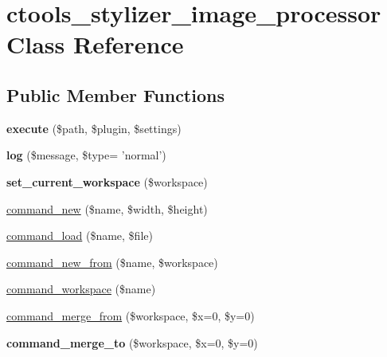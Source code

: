\hypertarget{classctools__stylizer__image__processor}{
\section{ctools\_\-stylizer\_\-image\_\-processor Class Reference}
\label{classctools__stylizer__image__processor}
}
\subsection*{Public Member Functions}
\begin{DoxyCompactItemize}
\item 
\hypertarget{classctools__stylizer__image__processor_a75d2a2d1fe5ef7708909e2fe6565268d}{
{\bfseries execute} (\$path, \$plugin, \$settings)}
\label{classctools__stylizer__image__processor_a75d2a2d1fe5ef7708909e2fe6565268d}

\item 
\hypertarget{classctools__stylizer__image__processor_a4cced5385e5b3165869dd30491621cfb}{
{\bfseries log} (\$message, \$type= 'normal')}
\label{classctools__stylizer__image__processor_a4cced5385e5b3165869dd30491621cfb}

\item 
\hypertarget{classctools__stylizer__image__processor_a357ae6f429c606217620187da9c78007}{
{\bfseries set\_\-current\_\-workspace} (\$workspace)}
\label{classctools__stylizer__image__processor_a357ae6f429c606217620187da9c78007}

\item 
\hyperlink{classctools__stylizer__image__processor_a8d40f8e9f29eef9d25907a05dd9874d7}{command\_\-new} (\$name, \$width, \$height)
\item 
\hyperlink{classctools__stylizer__image__processor_ac609fbaeff7f515d601195936f7e57d2}{command\_\-load} (\$name, \$file)
\item 
\hyperlink{classctools__stylizer__image__processor_a596478b51c878b732f2ad7512bc566df}{command\_\-new\_\-from} (\$name, \$workspace)
\item 
\hyperlink{classctools__stylizer__image__processor_ac718322ba340073405bdff291a5fbbf0}{command\_\-workspace} (\$name)
\item 
\hyperlink{classctools__stylizer__image__processor_a44a3092fdcc8287bf0cf730fa81e8a95}{command\_\-merge\_\-from} (\$workspace, \$x=0, \$y=0)
\item 
\hypertarget{classctools__stylizer__image__processor_a295ce266ce4cd8c6cdfa40f38aadc92c}{
{\bfseries command\_\-merge\_\-to} (\$workspace, \$x=0, \$y=0)}
\label{classctools__stylizer__image__processor_a295ce266ce4cd8c6cdfa40f38aadc92c}


\end{DoxyCompactItemize}
